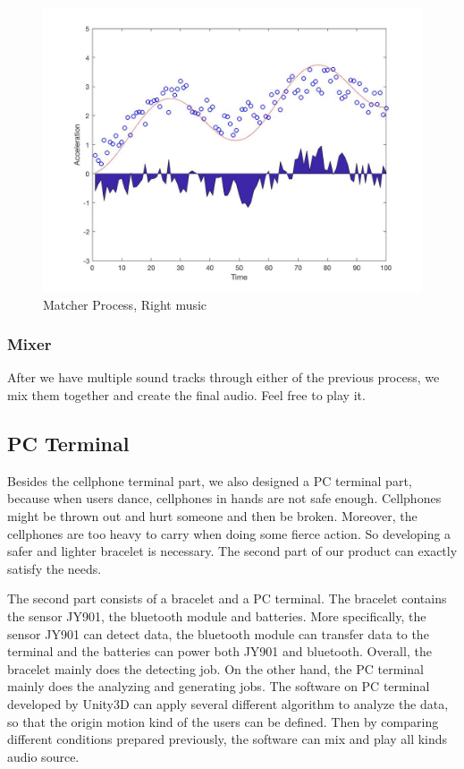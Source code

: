 \begin{figure}[H]
\centering
\includegraphics[width=\widthOfMatcherFigure]{figWR/matcher2}
\caption{Matcher Process, Right music}
\label{matcherStep1}
\end{figure}

\subsubsection{Mixer}

After we have multiple sound tracks through either of the previous process, we
mix them together and create the final audio. Feel free to play it. 

\subsection{PC Terminal}

Besides the cellphone terminal part, we also designed a PC terminal part,
because when users dance, cellphones in hands are not safe enough. Cellphones
might be thrown out and hurt someone and then be broken. Moreover, the
cellphones are too heavy to carry when doing some fierce action. So developing a
safer and lighter bracelet is necessary. The second part of our product can
exactly satisfy the needs. 

The second part consists of a bracelet and a PC terminal. The bracelet contains
the sensor JY901, the bluetooth module and batteries. More specifically, the
sensor JY901 can detect data, the bluetooth module can transfer data to the
terminal and the batteries can power both JY901 and bluetooth. Overall, the
bracelet mainly does the detecting job. On the other hand, the PC terminal
mainly does the analyzing and generating jobs. The software on PC terminal
developed by Unity3D can apply several different algorithm to analyze the data,
so that the origin motion kind of the users can be defined. Then by comparing
different conditions prepared previously, the software can mix and play all
kinds audio source. 


